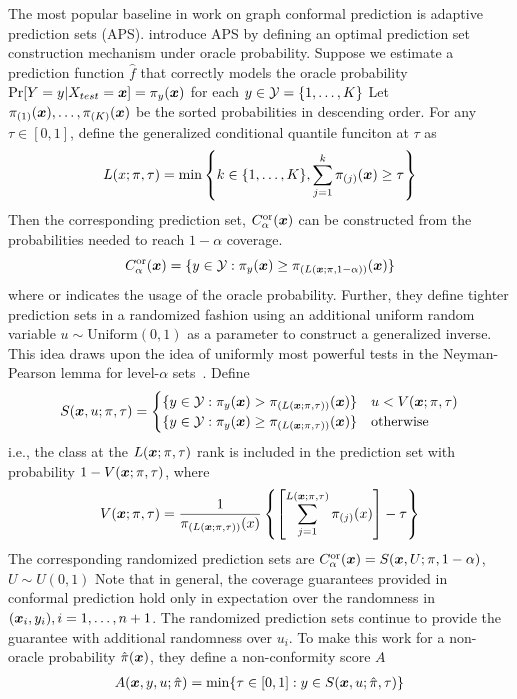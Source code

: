 The most popular baseline in work on graph conformal prediction is adaptive prediction sets (APS). 
\citet{romano2020classification} introduce APS by defining an optimal prediction set construction mechanism under oracle probability.
Suppose we estimate a prediction function $\hat{f}$ that correctly models the oracle probability $\Pr[Y=y|X_{test}={\bm{x}}] = \pi_y({\bm{x}})$ for each $y \in {\mathcal{Y}} = \{1, \dots, K\}$ 
Let $\pi_{(1)}({\bm{x}}), \dots, \pi_{(K)}({\bm{x}})$ be the sorted probabilities in descending order.
For any $\tau \in [0, 1]$, define the generalized conditional quantile funciton at $\tau$ as
\begin{align}
    L(x; \pi, \tau) =  \min\left\{ k \in \{1, \dots, K\}, \sum\limits_{j=1}^k \pi_{(j)}({\bm{x}}) \geq \tau \right\}
    \label{eq:APS:L}
\end{align}
Then the corresponding prediction set, $C_\alpha^{\text{or}}({\bm{x}})$ can be constructed from the probabilities needed to reach $1-\alpha$ coverage.
\[
    C_\alpha^{\text{or}}({\bm{x}}) = \{y \in {\mathcal{Y}}: \pi_y({\bm{x}}) \geq \pi_{(L({\bm{x}}; \pi, 1-\alpha))}({\bm{x}})\}
\]
where $\text{or}$ indicates the usage of the oracle probability.
Further, they define tighter prediction sets in a randomized fashion using an additional uniform random variable $u \sim \text{Uniform}(0, 1)$ as a parameter to construct a generalized inverse. 
This idea draws upon the idea of uniformly most powerful tests in the Neyman-Pearson lemma for level-$\alpha$ sets~\cite{neyman1933ix}.
Define
\begin{align}
    S({\bm{x}}, u; \pi, \tau) = \begin{cases}
        \{y \in {\mathcal{Y}}: \pi_y({\bm{x}}) > \pi_{(L({\bm{x}}; \pi, \tau))}({\bm{x}})\} & u < V({\bm{x}}; \pi, \tau) \\
        \{y \in {\mathcal{Y}}: \pi_y({\bm{x}}) \geq \pi_{(L({\bm{x}}; \pi, \tau))}({\bm{x}})\} & \text{otherwise}
    \end{cases}
    \label{eq:APS:S}    
\end{align}
i.e., the class at the $L({\bm{x}}; \pi, \tau)$ rank is included in the prediction set with probability $1 - V({\bm{x}}; \pi, \tau)$, where
\[
V({\bm{x}}; \pi, \tau) = \frac{1}{\pi_{(L({\bm{x}}; \pi, \tau))}(x)} \left\{ \left[\sum\limits_{j=1}^{L({\bm{x}}; \pi, \tau)}{\pi_{(j)}(x)} \right] - \tau \right\}
\]
The corresponding randomized prediction sets are $C_\alpha^{\text{or}}({\bm{x}}) = S({\bm{x}}, U; \pi, 1 - \alpha)$, $U \sim U(0, 1)$
Note that in general, the coverage guarantees provided in conformal prediction hold only in expectation over the randomness in $({\bm{x}}_i, y_i), i = 1, \dots, n+1$.
The randomized prediction sets continue to provide the guarantee with additional randomness over $u_i$.
To make this work for a non-oracle probability $\hat{\pi}({\bm{x}})$, they define a non-conformity score $A$
\begin{align}
    A({\bm{x}}, y, u;\hat{\pi}) = \min\{\tau \in [0, 1]: y \in S({\bm{x}}, u; \hat{\pi}, \tau)\}
    \label{eq:APS:score}
\end{align}

